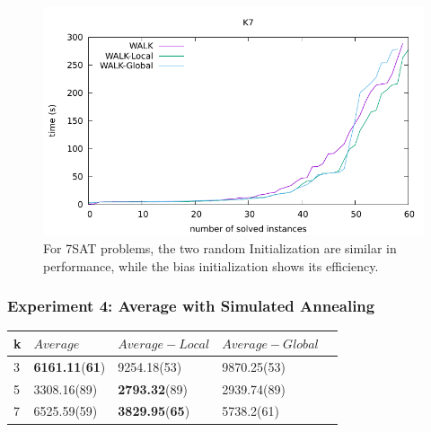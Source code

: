\documentclass[12pt,a4paper,twoside]{scrartcl}
\numberwithin{equation}{section}
\begin{document}
  \begin{figure}[H]
\begin{center}
  \includegraphics[scale = 1]{DATA/K7/e3w.pdf}
  \end{center}
  \caption{For 7SAT problems, the two random Initialization are similar in performance, while the bias initialization shows its efficiency.}
  \label{Experiment 3 k7-w cactus plot}
  \end{figure}
\subsubsection{Experiment 4: Average with Simulated Annealing} 
\label{sec:Experiment 4}
\begin{table}[h!]
\begin{center}
    \begin{tabular}{|l|l|l|l|p{3cm}|}
\hline 

    k &$Average$&$Average-Local$&$Average-Global$ \\ \hline      
    3 & \textbf{6161.11}(\textbf{61})	&9254.18(53)&	9870.25(53) \\ \hline
    5& 3308.16(89)	&\textbf{2793.32}(89)&	2939.74(89)\\ \hline
    7& 6525.59(59)&\textbf{	3829.95}(\textbf{65})	&5738.2(61)\\ \hline	
\end{tabular}
\end{center}
\end{table} 
\end{document}
